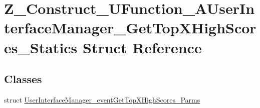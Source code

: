 \hypertarget{struct_z___construct___u_function___a_user_interface_manager___get_top_x_high_scores___statics}{}\section{Z\+\_\+\+Construct\+\_\+\+U\+Function\+\_\+\+A\+User\+Interface\+Manager\+\_\+\+Get\+Top\+X\+High\+Scores\+\_\+\+Statics Struct Reference}
\label{struct_z___construct___u_function___a_user_interface_manager___get_top_x_high_scores___statics}
\subsection*{Classes}
\begin{DoxyCompactItemize}
\item 
struct \mbox{\hyperlink{struct_z___construct___u_function___a_user_interface_manager___get_top_x_high_scores___statics_1304ac90e56efdd7702dabb87cd8072a7}{User\+Interface\+Manager\+\_\+event\+Get\+Top\+X\+High\+Scores\+\_\+\+Parms}}
\end{DoxyCompactItemize}
